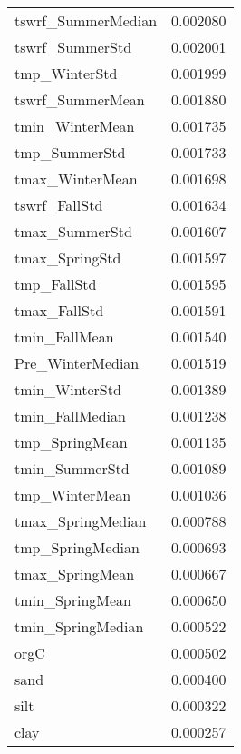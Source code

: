 \begin{tabular}{lr}
tswrf_SummerMedian & 0.002080 \\
tswrf_SummerStd & 0.002001 \\
tmp_WinterStd & 0.001999 \\
tswrf_SummerMean & 0.001880 \\
tmin_WinterMean & 0.001735 \\
tmp_SummerStd & 0.001733 \\
tmax_WinterMean & 0.001698 \\
tswrf_FallStd & 0.001634 \\
tmax_SummerStd & 0.001607 \\
tmax_SpringStd & 0.001597 \\
tmp_FallStd & 0.001595 \\
tmax_FallStd & 0.001591 \\
tmin_FallMean & 0.001540 \\
Pre_WinterMedian & 0.001519 \\
tmin_WinterStd & 0.001389 \\
tmin_FallMedian & 0.001238 \\
tmp_SpringMean & 0.001135 \\
tmin_SummerStd & 0.001089 \\
tmp_WinterMean & 0.001036 \\
tmax_SpringMedian & 0.000788 \\
tmp_SpringMedian & 0.000693 \\
tmax_SpringMean & 0.000667 \\
tmin_SpringMean & 0.000650 \\
tmin_SpringMedian & 0.000522 \\
orgC & 0.000502 \\
sand & 0.000400 \\
silt & 0.000322 \\
clay & 0.000257 \\
\bottomrule
\end{tabular}
